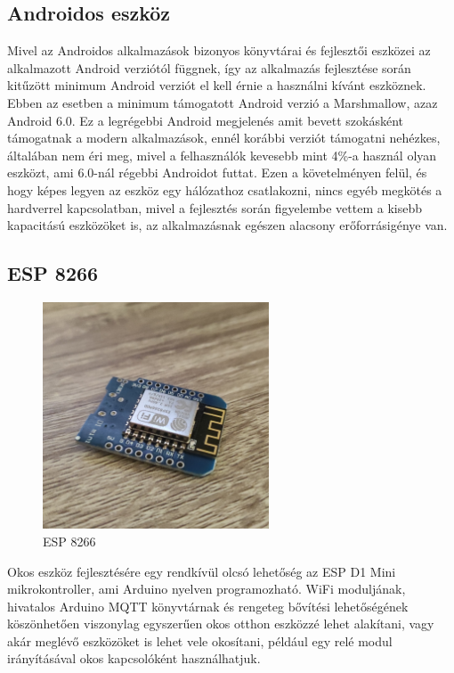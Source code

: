 \documentclass[
]{thesis-ekf}
\theoremstyle{definition}
\theoremstyle{remark}
\begin{document}
\subsection{Androidos eszköz}
Mivel az Androidos alkalmazások bizonyos könyvtárai és fejlesztői eszközei az alkalmazott Android verziótól függnek, 
így az alkalmazás fejlesztése során kitűzött minimum Android verziót el kell érnie a használni kívánt eszköznek. 
Ebben az esetben a minimum támogatott Android verzió a Marshmallow, azaz Android 6.0. Ez a legrégebbi Android megjelenés 
amit bevett szokásként támogatnak a modern alkalmazások, ennél korábbi verziót támogatni nehézkes, általában nem éri meg, mivel
a felhasználók kevesebb mint 4\%-a használ olyan eszközt, ami 6.0-nál régebbi Androidot futtat\cite{android-versions}.
Ezen a követelményen felül, és hogy képes legyen az eszköz egy hálózathoz csatlakozni, nincs egyéb megkötés a hardverrel
kapcsolatban, mivel a fejlesztés során figyelembe vettem a kisebb kapacitású eszközöket is, az alkalmazásnak
egészen alacsony erőforrásigénye van.

\subsection{ESP 8266}

\begin{figure}[h]
	\centering
	\includegraphics[width=0.6\textwidth]{images/esp.png}
	\caption{ESP 8266}
\end{figure}

Okos eszköz fejlesztésére egy rendkívül olcsó lehetőség az ESP D1 Mini mikrokontroller, ami Arduino nyelven
programozható. WiFi moduljának, hivatalos Arduino MQTT könyvtárnak és rengeteg bővítési lehetőségének
köszönhetően viszonylag egyszerűen okos otthon eszközzé lehet alakítani, vagy akár meglévő eszközöket
is lehet vele okosítani, például egy relé modul irányításával okos kapcsolóként használhatjuk.
\end{document}
